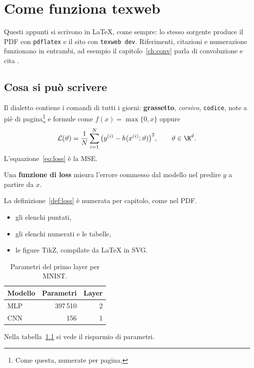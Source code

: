 \chapter{Come funziona texweb}\label{ch:intro}
Questi appunti si scrivono in \LaTeX{}, come sempre: lo stesso sorgente produce il PDF con \texttt{pdflatex} e il sito con \texttt{texweb dev}. Riferimenti, citazioni e numerazione funzionano in entrambi, ad esempio il capitolo~\ref{ch:conv} parla di convoluzione e cita \cite{Goodfellow-et-al-2016}.

\section{Cosa si può scrivere}
Il dialetto contiene i comandi di tutti i giorni: \textbf{grassetto}, \emph{corsivo}, \texttt{codice}, note a piè di pagina\footnote{Come questa, numerate per pagina.} e formule come $f(x) = \max\{0, x\}$ oppure
\begin{equation}\label{eq:loss}
  \mathcal{L}(\vartheta) = \frac{1}{N}\sum_{i=1}^{N} \big(y^{(i)} - h(x^{(i)}; \vartheta)\big)^2, \qquad \vartheta \in \R^d.
\end{equation}
L'equazione~\eqref{eq:loss} è la MSE.

\begin{definizione}\label{def:loss}
Una \textbf{funzione di loss} misura l'errore commesso dal modello nel predire $y$ a partire da $x$.
\end{definizione}

La definizione~\ref{def:loss} è numerata per capitolo, come nel PDF.

\begin{itemize}
  \item gli elenchi puntati,
  \item gli elenchi numerati e le tabelle,
  \item le figure TikZ, compilate da \LaTeX{} in SVG.
\end{itemize}

\begin{table}[htbp]
\centering
\begin{tabular}{@{}lrr@{}}
\toprule
Modello & Parametri & Layer \\
\midrule
MLP & 397\,510 & 2 \\
CNN & 156 & 1 \\
\bottomrule
\end{tabular}
\caption{Parametri del primo layer per MNIST.}
\label{tab:param}
\end{table}

Nella tabella~\ref{tab:param} si vede il risparmio di parametri.
